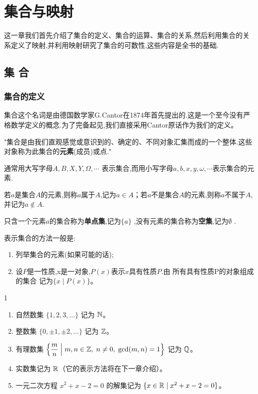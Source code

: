 \chapter{集合与映射}

这一章我们首先介绍了集合的定义、集合的运算、集合的关系,然后利用集合的关系定义了映射,并利用映射研究了集合的可数性,这些内容是全书的基础.

\section{集 合}

\subsection{集合的定义}
	\label{sec:1-1-1}

集合这个名词是由德国数学家G.Cantor在1874年首先提出的.这是一个至今没有严格数学定义的概念.为了完备起见,我们直接采用Cantor原话作为我们的定义。

\begin{mydef*}{}
	
"集合是由我们直观感觉或意识到的、确定的、不同对象汇集而成的一个整体.这些对象称为此集合的\textbf{元素}(成员)或点."

\end{mydef*}

通常用大写字母$A,B,X,Y,\Omega,\cdots$ 表示集合,而用小写字母$a,b,x,y,\omega,\cdots $表示集合的元素.

若$a$是集合$A$的元素,则称$a$属于$A$,记为$a \in A$；若$a$不是集合$A$的元素,则称$a$不属于$A$,并记为\(a \notin A\).

只含一个元素$a$的集合称为\textbf{单点集},记为$\{a\}$ ,没有元素的集合称为\textbf{空集},记为$\emptyset$ .

表示集合的方法一般是:

\begin{enumerate}
\def\labelenumi{\arabic{enumi})}
\tightlist
\item
  列举集合的元素(如果可能的话);
\item
  设$P$是一性质,x是一对象,$P(x)$表示$x$具有性质$P$.由 所有具有性质P的对象组成的集合 记为$\{x\mid P(x)\}$。
\end{enumerate}

\begin{sourceexample}{1}
	\begin{enumerate}[label=\arabic{enumi}),leftmargin=1.8em]
		\item 自然数集 $\{1,2,3,\dots\}$ 记为 $\mathbb{N}$。
		\item 整数集 $\{0,\pm1,\pm2,\dots\}$ 记为 $\mathbb{Z}$。
		\item 有理数集 $\left\{\dfrac{m}{n}\;\middle|\; m,n\in\mathbb{Z},\;n\neq0,\;\gcd(m,n)=1\right\}$ 记为 $\mathbb{Q}$。
		\item 实数集记为 $\mathbb{R}$（它的表示方法将在下一章介绍）。
		\item 一元二次方程 $x^2+x-2=0$ 的解集记为 $\{x\in\mathbb{R}\mid x^2+x-2=0\}$。
	\end{enumerate}
\end{sourceexample}

